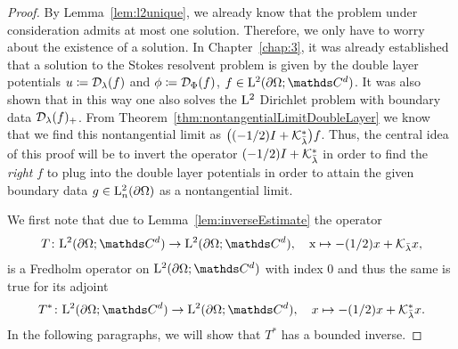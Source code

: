 \begin{proof}
  By Lemma~\ref{lem:l2unique}, we already know that the problem under consideration admits at most one solution.
  Therefore, we only have to worry about the existence of a solution.
  In Chapter~\ref{chap:3}, it was already established that a solution to the Stokes resolvent problem is given by the double layer potentials $u \coloneqq \mathcal{D}_\lambda(f)$ and $\phi \coloneqq \mathcal{D}_\Phi(f)$, $f \in \Ell^2(\partial\Omega; \C^d)$.
  It was also shown that in this way one also solves the $\mathrm{L}^2$ Dirichlet problem with boundary data $\mathcal{D}_\lambda(f)_+$.
  From Theorem~\ref{thm:nontangentialLimitDoubleLayer} we know that we find this nontangential limit as $\big((-1/2)I + \mathcal{K}_{\bar\lambda}^*\big)f$.
  Thus, the central idea of this proof will be to invert the operator $(-1/2)I + \mathcal{K}_{\bar\lambda}^*$ in order to find the \emph{right} $f$ to plug into the double layer potentials in order to attain the given boundary data $g \in \mathrm{L}^2_n(\partial\Omega)$ as a nontangential limit.
  
  We first note that due to Lemma~\ref{lem:inverseEstimate} the operator
  \begin{align*}
    T \colon \Ell^2(\partial\Omega; \C^d) \to \Ell^2(\partial\Omega; \C^d), \quad\text x \mapsto -(1/2)x  + \K_{\bar \lambda}x,
  \end{align*}
  is a Fredholm operator on $\Ell^2(\partial\Omega; \C^d)$ with index $0$ and thus the same is true for its adjoint 
  \begin{align*}
    T^* \colon \Ell^2(\partial\Omega; \C^d) \to \Ell^2(\partial\Omega; \C^d),\quad x \mapsto  -(1/2)x + \K_{\bar\lambda}^*x.
  \end{align*}
  In the following paragraphs, we will show that $T^*$ has a bounded inverse.


\end{proof}
